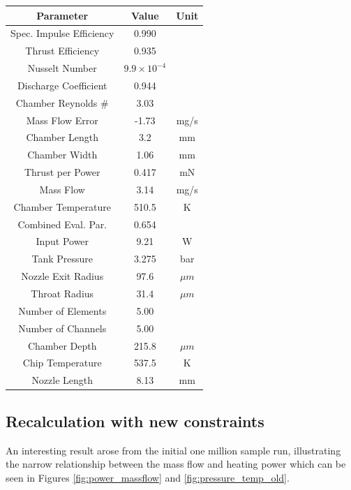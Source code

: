 \documentclass{homework}
\begin{document}
\begin{multicols}{2}
 
    \begin{minipage}{\linewidth}
      \centering
      \label{tab:best_design}
      \begin{tabular}{|c|c|c|}
          \hline
          \textbf{Parameter} & \textbf{Value} & \textbf{Unit} \\
          \hline
          Spec. Impulse Efficiency & 0.990 & \\
          Thrust Efficiency & 0.935 & \\
          Nusselt Number & $9.9 \times 10^{-4}$ & \\
          Discharge Coefficient & 0.944 & \\
          Chamber Reynolds \# & 3.03 & \\
          Mass Flow Error & -1.73 & mg/s \\
          Chamber Length & 3.2 & mm \\
          Chamber Width & 1.06 & mm \\
          Thrust per Power & 0.417 & mN \\
          Mass Flow & 3.14 & mg/s \\
          Chamber Temperature & 510.5 & K \\
          Combined Eval. Par. & 0.654 & \\
          Input Power & 9.21 & W \\
          Tank Pressure & 3.275 & bar \\
          Nozzle Exit Radius & 97.6  & $\mu m$ \\
          Throat Radius & 31.4 & $\mu m$ \\
          Number of Elements & 5.00 & \\
          Number of Channels & 5.00 & \\
          Chamber Depth & 215.8 & $\mu m$ \\
          Chip Temperature & 537.5 & K \\
          Nozzle Length & 8.13 & mm \\
          \hline
      \end{tabular}
  
    \end{minipage}

\subsection{Recalculation with new constraints}
  
  An interesting result arose from the initial one million sample run, illustrating the narrow relationship between the mass flow and heating power which can be seen in Figures \ref{fig:power_massflow} and \ref{fig:pressure_temp_old}.  
  

\end{multicols}
\end{document}
